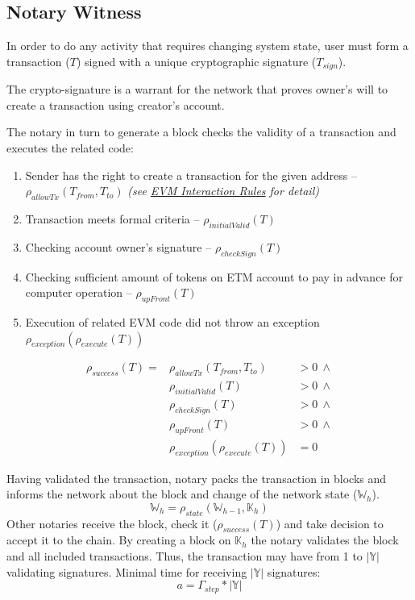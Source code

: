 \documentclass[12pt]{report}
\begin{document}
\subsection{Notary Witness}
\label{tech-blockchain-confirmation}
\begin{multicols}{2}
In order to do any activity that requires changing system state, user must form a transaction ($T$) signed with a unique cryptographic signature ($T_{sign}$). 

The crypto-signature is a warrant for the network that proves owner's will to create a transaction using creator's account. 

The notary in turn to generate a block checks the validity of a transaction and executes the related code:
\begin{enumerate}
\item Sender has the right to create a transaction for the given address – $\rho_{allowTx}(T_{from}, T_{to})$ \textit{(see \hyperref[tech-blockchain-rules]{EVM Interaction Rules} for detail)}
\item Transaction meets formal criteria – $\rho_{initialValid}(T)$
\item Checking account owner's signature – $\rho_{checkSign}(T)$
\item Checking sufficient amount of tokens on ETM account to pay in advance for computer operation – $\rho_{upFront}(T)$
\item Execution of related	EVM code	did not 	throw an exception $\rho_{exception}(\rho_{execute}(T))$
\end{enumerate}
\end{multicols}
\begin{align}
\rho_{success}(T) = 	&\rho_{allowTx}(T_{from}, T_{to}) &> 0 \ \wedge \\
 								&\rho_{initialValid}(T) &> 0 \ \wedge \\
								&\rho_{checkSign}(T) &> 0 \ \wedge \\
								&\rho_{upFront}(T) &> 0 \ \wedge \\
 								&\rho_{exception}(\rho_{execute}(T)) &= 0
\end{align}
\begin{multicols}{2}
Having validated the transaction, notary packs the transaction in blocks and informs the network about the block and change of the network state ($\mathbb{W}_h$).
\begin{equation}
\mathbb{W}_h = \rho_{state}(\mathbb{W}_{h-1}, \mathbb{K}_h)
\end{equation}
Other notaries receive the block, check it ($\rho_{success}(T)$) and take decision to accept it to the chain. By creating a block on $\mathbb{K}_h$ the notary validates the block and all included transactions.
Thus, the transaction may have from 1 to $|\mathbb{Y}|$ validating signatures.
Minimal time for receiving $|\mathbb{Y}|$ signatures:
\begin{equation}
a = \Gamma_{step} * |\mathbb{Y}|
\end{equation}
\end{multicols}
\vfill\null\pagebreak
\end{document}
